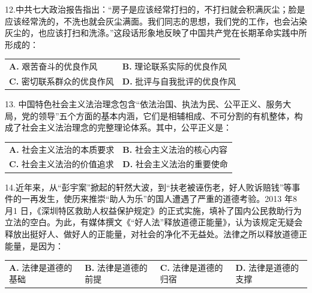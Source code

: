 \documentclass[UTF8,11pt]{ctexart}
\begin{document}
12.中共七大政治报告指出：“房子是应该经常打扫的，不打扫就会积满灰尘；脸是应该经常洗的，不洗也就会灰尘满面。我们同志的思想，我们党的工作，也会沾染灰尘的，也应该打扫和洗涤。”这段话形象地反映了中国共产党在长期革命实践中所形成的：


\begin{center}\begin{tabular}{>{\raggedright\arraybackslash}p{\dimexpr(\linewidth-4\tabcolsep)/2\relax}>{\raggedright\arraybackslash}p{\dimexpr(\linewidth-4\tabcolsep)/2\relax}}
\textbf{A.} 艰苦奋斗的优良作风 & \textbf{B.} 理论联系实际的优良作风\\[.35em]
\textbf{C.} 密切联系群众的优良作风 & \textbf{D.} 批评与自我批评的优良作风\\[.35em]\end{tabular}\end{center}

13. 中国特色社会主义法治理念包含“依法治国、执法为民、公平正义、服务大局，党的领导”五个方面的基本内涵，它们是相辅相成、不可分割的有机整体，构成了社会主义法治理念的完整理论体系。其中，公平正义是：


\begin{center}\begin{tabular}{>{\raggedright\arraybackslash}p{\dimexpr(\linewidth-4\tabcolsep)/2\relax}>{\raggedright\arraybackslash}p{\dimexpr(\linewidth-4\tabcolsep)/2\relax}}
\textbf{A.} 社会主义法治的本质要求 & \textbf{B.} 社会主义法治的核心内容\\[.35em]
\textbf{C.} 社会主义法治的价值追求 & \textbf{D.} 社会主义法治的重要使命\\[.35em]\end{tabular}\end{center}

14.近年来，从“彭宇案”掀起的轩然大波，到“扶老被诬伤老，好人败诉赔钱”等事件的一再发生，使历来推崇“助人为乐”的国人遭遇了严重的道德考验。2013 年8 月1 日，《深圳特区救助人权益保护规定》的正式实施，填补了国内公民救助行为立法的空白。为此，有媒体撰文《“好人法”释放道德正能量》，认为该规定无疑会释放出挺好人、做好人的正能量，对社会的净化不无益处。法律之所以释放道德正能量，是因为：


\begin{center}\begin{tabular}{>{\raggedright\arraybackslash}p{\dimexpr(\linewidth-8\tabcolsep)/4\relax}>{\raggedright\arraybackslash}p{\dimexpr(\linewidth-8\tabcolsep)/4\relax}>{\raggedright\arraybackslash}p{\dimexpr(\linewidth-8\tabcolsep)/4\relax}>{\raggedright\arraybackslash}p{\dimexpr(\linewidth-8\tabcolsep)/4\relax}}
\textbf{A.} 法律是道德的基础 & \textbf{B.} 法律是道德的前提 & \textbf{C.} 法律是道德的归宿 & \textbf{D.} 法律是道德的支撑\\[.35em]\end{tabular}\end{center}
\end{document}
